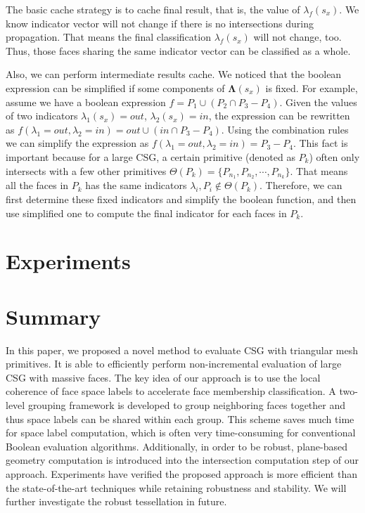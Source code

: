 \documentclass[10pt,journal,compsoc]{IEEEtran}
\begin{document}
The basic cache strategy is to cache final result, that is, the value of $\lambda_f(s_x)$. We know indicator vector will not change if there is no intersections during propagation. That means the final classification $\lambda_f(s_x)$ will not change, too. Thus, those faces sharing the same indicator vector can be classified as a whole.

Also, we can perform intermediate results cache. We noticed that the boolean expression can be simplified if some components of $\boldsymbol{\Lambda}(s_x)$ is fixed. For example, assume we have a boolean expression $f = P_1\cup (P_2\cap P_3-P_4)$. Given the values of two indicators $\lambda_1(s_x)=out$, $\lambda_2(s_x)=in$, the expression can be rewritten as $f(\lambda_1=out, \lambda_2=in)=out\cup (in\cap P_3-P_4)$. Using the combination rules we can simplify the expression as $f(\lambda_1=out, \lambda_2=in)=P_3-P_4$. This fact is important because for a large CSG, a certain primitive (denoted as $P_k$) often only intersects with a few other primitives $\Theta(P_k)= \{P_{n_1}, P_{n_2}, \cdots, P_{n_k}\}$. That means all the faces in $P_k$ has the same indicators $\lambda_{i}, P_{i} \notin \Theta(P_k)$. Therefore, we can first determine these fixed indicators and simplify the boolean function, and then use simplified one to compute the final indicator for each faces in $P_k$.

\section{Experiments}

\section{Summary}

In this paper, we proposed a novel method to evaluate CSG with triangular mesh primitives. It is able to efficiently perform non-incremental evaluation of large CSG with massive faces. The key idea of our approach is to use the local coherence of face space labels to accelerate face membership classification. A two-level grouping framework is developed to group neighboring faces together and thus space labels can be shared within each group. This scheme saves much time for space label computation, which is often very time-consuming for conventional Boolean evaluation algorithms. Additionally, in order to be robust, plane-based geometry computation is introduced into the intersection computation step of our approach. Experiments have verified the proposed approach is more efficient than the state-of-the-art techniques while retaining robustness and stability. We will further investigate the robust tessellation in future.
\end{document}
